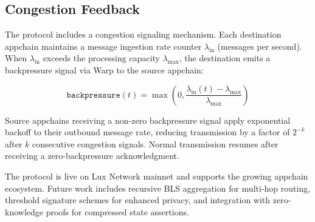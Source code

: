 \subsection{Congestion Feedback}

The protocol includes a congestion signaling mechanism. Each destination appchain maintains a message ingestion rate counter $\lambda_{\text{in}}$ (messages per second). When $\lambda_{\text{in}}$ exceeds the processing capacity $\lambda_{\max}$, the destination emits a backpressure signal via Warp to the source appchain:

\begin{equation}
    \texttt{backpressure}(t) = \max\!\left(0, \frac{\lambda_{\text{in}}(t) - \lambda_{\max}}{\lambda_{\max}}\right)
\end{equation}

Source appchains receiving a non-zero backpressure signal apply exponential backoff to their outbound message rate, reducing transmission by a factor of $2^{-k}$ after $k$ consecutive congestion signals. Normal transmission resumes after receiving a zero-backpressure acknowledgment.

The protocol is live on Lux Network mainnet and supports the growing appchain ecosystem. Future work includes recursive BLS aggregation for multi-hop routing, threshold signature schemes for enhanced privacy, and integration with zero-knowledge proofs for compressed state assertions.

